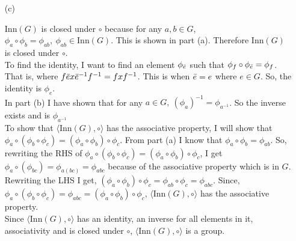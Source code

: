 \documentclass[titlepage]{article}
\begin{document}
\begin{solution}
\begin{itemize}
\item[(c)] 
\begin{myproof}
$\text{Inn}(G)$ is closed under $\circ$ because for any $a,b \in G$, $\phi_a \circ \phi_b = \phi_{ab}, \ \phi_{ab} \in \text{Inn}(G)$. This is shown in part (a). Therefore $\text{Inn}(G)$ is closed under $\circ$.
\\
To find the identity, I want to find an element $\phi_{\bar{e}}$ such that $\phi_f \circ \phi_{\bar{e}} = \phi_f$. That is, where $f\bar{e}x\bar{e}^{-1}f^{-1} = fxf^{-1}$. This is when $\bar{e} = e$ where $e \in G$. So, the identity is $\phi_{e}$. 
\\
In part (b) I have shown that for any $a\in G, \ (\phi_a)^{-1} = \phi_{a^{-1}}$. So the inverse exists and is $\phi_{a^{-1}}$
\\
To show that $\langle \text{Inn}(G), \circ \rangle$ has the associative property, I will show that $\phi_a \circ (\phi_b \circ \phi_c) = (\phi_a \circ \phi_b) \circ \phi_c$. From part (a) I know that $\phi_a \circ \phi_b = \phi_{ab}$. So, rewriting the RHS of  $\phi_a \circ (\phi_b \circ \phi_c) = (\phi_a \circ \phi_b) \circ \phi_c$, I get $\phi_a \circ (\phi_{bc}) =\phi_{a(bc)} = \phi_{abc}$ because of the associative property which is in $G$. Rewriting the LHS I get, $(\phi_a \circ \phi_b) \circ \phi_c = \phi_{ab} \circ \phi_c = \phi_{abc}$. Since, $\phi_a \circ (\phi_b \circ \phi_c) = \phi_{abc} = (\phi_a \circ \phi_b) \circ \phi_c$, $\langle \text{Inn}(G), \circ \rangle$ has the associative property.
\\ 
Since $\langle \text{Inn}(G), \circ \rangle$ has an identity, an inverse for all elements in it, associativity and is closed under $\circ$, $\langle \text{Inn}(G) , \circ \rangle$ is a group.
\end{myproof}
\end{itemize}
\end{solution}
\end{document}
